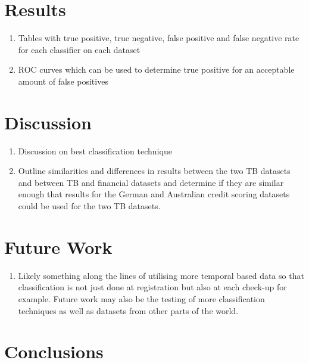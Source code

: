 \documentclass{sig-alternate-05-2015}
\begin{document}
\section{Results}
\begin{enumerate}
	\item Tables with true positive, true negative, false positive and false negative rate for each classifier on each dataset
	\item ROC curves which can be used to determine true positive for an acceptable amount of false positives
\end{enumerate}

\section{Discussion}
\begin{enumerate}
	\item Discussion on best classification technique
	\item Outline similarities and differences in results between the two TB datasets and between TB and financial datasets and determine if they are similar enough that results for the German and Australian credit scoring datasets could be used for the two TB datasets.
	
\end{enumerate}

\section{Future Work}
\begin{enumerate}
	\item Likely something along the lines of utilising more temporal based data so that classification is not just done at registration but also at each check-up for example. Future work may also be the testing of more classification techniques as well as datasets from other parts of the world.
\end{enumerate}

\section{Conclusions}

%

%
\end{document}
